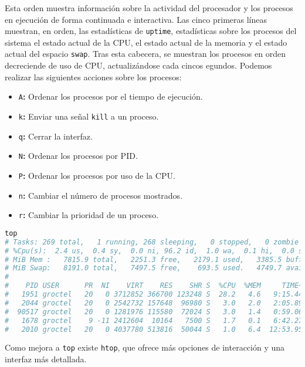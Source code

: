 Esta orden muestra información sobre la actividad del procesador y los procesos en ejecución de forma continuada e interactiva.
Las cinco primeras líneas muestran, en orden, las estadísticas de \texttt{uptime}, estadísticas sobre los procesos del sistema el estado actual de la CPU, el estado actual de la  memoria y el estado actual del espacio \texttt{swap}.
Tras esta cabecera, se muestran los procesos en orden decreciende de uso de CPU, actualizándose cada cincos egundos.
Podemos realizar las siguientes acciones sobre los procesos:

\begin{itemize}
	\item\texttt{A}\textbf{:} Ordenar los procesos por el tiempo de ejecución.
	\item\texttt{k}\textbf{:} Enviar una señal \texttt{kill} a un proceso.
	\item\texttt{q}\textbf{:} Cerrar la interfaz.
	\item\texttt{N}\textbf{:} Ordenar los procesos por PID\@.
	\item\texttt{P}\textbf{:} Ordenar los procesos por uso de la CPU\@.
	\item\texttt{n}\textbf{:} Cambiar el número de procesos mostrados.
	\item\texttt{r}\textbf{:} Cambiar la prioridad de un proceso.
\end{itemize}

\begin{lstlisting}[language=Bash]
top
# Tasks: 269 total,   1 running, 268 sleeping,   0 stopped,   0 zombie
# %Cpu(s):  2.4 us,  0.4 sy,  0.0 ni, 96.2 id,  1.0 wa,  0.1 hi,  0.0 si,  0.0 st
# MiB Mem :   7815.9 total,   2251.3 free,   2179.1 used,   3385.5 buff/cache
# MiB Swap:   8191.0 total,   7497.5 free,    693.5 used.   4749.7 avail Mem
#
#    PID USER      PR  NI    VIRT    RES    SHR S  %CPU  %MEM     TIME+ COMMAND
#   1951 groctel   20   0 3712852 366700 123248 S  28.2   4.6   9:15.44 firefox
#   2044 groctel   20   0 2542732 157648  96980 S   3.0   2.0   2:05.89 Web Content
#  90517 groctel   20   0 1281976 115580  72024 S   3.0   1.4   0:59.06 mpv
#   1678 groctel    9 -11 2412604  10164   7500 S   1.7   0.1   6:42.27 pulseaudio
#   2010 groctel   20   0 4037780 513816  50044 S   1.0   6.4  12:53.95 telegram-deskto
\end{lstlisting}

Como mejora a \texttt{top} existe \texttt{htop}, que ofrece más opciones de interacción y una interfaz más detallada.

